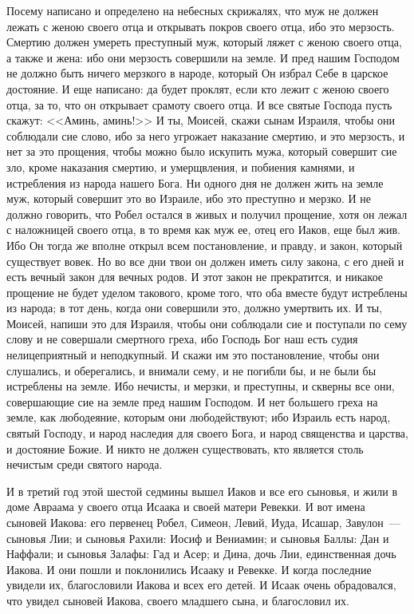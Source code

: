 Посему написано и определено на небесных
скрижалях, что муж не должен лежать с женою
своего отца и открывать покров своего отца, ибо
это мерзость. Смертию должен умереть преступный
муж, который ляжет с женою своего отца, а также и
жена: ибо они мерзость совершили на земле. И пред
нашим Господом не должно быть ничего мерзкого в
народе, который Он избрал Себе в царское
достояние. И еще написано: да будет проклят, если
кто лежит с женою своего отца, за то, что он
открывает срамоту своего отца. И все святые
Господа пусть скажут: <<Аминь, аминь!>> И ты,
Моисей, скажи сынам Израиля, чтобы они соблюдали
сие слово, ибо за него угрожает наказание
смертию, и это мерзость, и нет за это прощения,
чтобы можно было искупить мужа, который совершит
сие зло, кроме наказания смертию, и умерщвления, и
побиения камнями, и истребления из народа нашего
Бога. Ни одного дня не должен жить на земле муж,
который совершит это во Израиле, ибо это
преступно и мерзко. И не должно говорить, что
Робел остался в живых и получил прощение, хотя он
лежал с наложницей своего отца, в то время как муж
ее, отец его Иаков, еще был жив. Ибо Он тогда же
вполне открыл всем постановление, и правду, и
закон, который существует вовек. Но во все дни
твои он должен иметь силу закона, с его дней и
есть вечный закон для вечных родов. И этот закон
не прекратится, и никакое прощение не будет
уделом такового, кроме того, что оба вместе будут
истреблены из народа; в тот день, когда они
совершили это, должно умертвить их. И ты, Моисей,
напиши это для Израиля, чтобы они соблюдали сие и
поступали по сему слову и не совершали смертного
греха, ибо Господь Бог наш есть судия
нелицеприятный и неподкупный. И скажи им это
постановление, чтобы они слушались, и
оберегались, и внимали сему, и не погибли бы, и не
были бы истреблены на земле. Ибо нечисты, и
мерзки, и преступны, и скверны все они,
совершающие сие на земле пред нашим Господом. И
нет большего греха на земле, как любодеяние,
которым они любодействуют; ибо Израиль есть
народ, святый Господу, и народ наследия для
своего Бога, и народ священства и царства, и
достояние Божие. И никто не должен
существовать, кто является столь нечистым среди
святого народа.

И в третий год этой шестой седмины вышел Иаков и
все его сыновья, и жили в доме Авраама у своего
отца Исаака и своей матери Ревекки. И вот имена
сыновей Иакова: его первенец Робел, Симеон, Левий,
Иуда, Исашар, Завулон~--- сыновья Лии; и сыновья
Рахили: Иосиф и Вениамин; и сыновья Баллы: Дан и
Наффали; и сыновья Залафы: Гад и Асер; и Дина, дочь
Лии, единственная дочь Иакова. И они пошли и
поклонились Исааку и Ревекке. И когда последние
увидели их, благословили Иакова и всех его детей.
И Исаак очень обрадовался, что увидел сыновей
Иакова, своего младшего сына, и благословил их.

